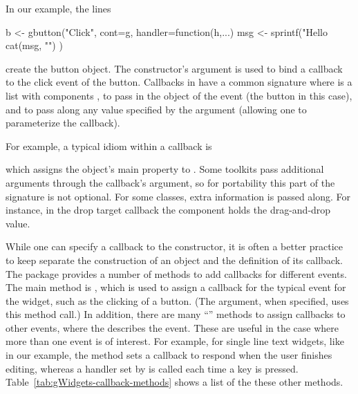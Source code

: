 


In our example, the lines
\begin{Schunk}
\begin{Sinput}
 b <- gbutton("Click", cont=g, handler=function(h,...) {
   msg <- sprintf("Hello %
   cat(msg, "\n")
 })
\end{Sinput}
\end{Schunk}
%
create the button object. The constructor's argument  is
used to bind a callback to the click event of the button. Callbacks in
 have a common signature  where 
is a list with components , to pass in the object of the
event (the button in this case), and  to pass along any
value specified by the  argument (allowing one to
parameterize the callback).

For example, a typical idiom within a callback is
\begin{Schunk}
\end{Schunk}
%
which assigns the object's main property to .  Some
toolkits pass additional arguments through the callback's 
argument, so for portability this part of the signature is not optional. For some
classes, extra information is passed along. For instance, in the drop
target callback the component  
holds the drag-and-drop value.


While one can specify a callback to the constructor, it is often a
better practice to keep separate the construction of an object and the
definition of its callback.  The package provides a number of methods
to add callbacks for different events. The main method is
, which is used to assign a callback for the
typical event for the widget, such as the clicking of a button. (The
 argument, when specified, uses this method call.)  In
addition, there are many ``'' methods to assign
callbacks to other events, where the  describes the
event. These are useful in the case where more than one event is of
interest. For example, for single line text widgets, like  in
our example, the  method sets a callback to
respond when the user finishes editing, whereas a handler set by
 is called each time a key is pressed.
Table~\ref{tab:gWidgets-callback-methods} shows a list of the these
other methods.

